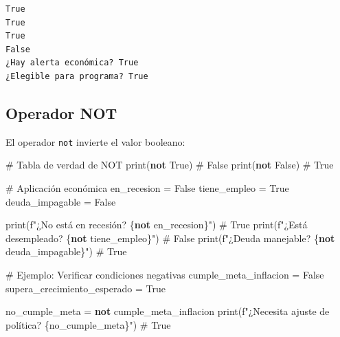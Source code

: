 \documentclass[
  doc,
  floatsintext,
  longtable,
  a4paper,
  nolmodern,
  notxfonts,
  notimes,
  12pt,
  colorlinks=true,linkcolor=blue,citecolor=blue,urlcolor=blue]{apa7}
\newenvironment{Shaded}{\begin{snugshade}}{\end{snugshade}}
\newcommand{\BuiltInTok}[1]{\textcolor[rgb]{0.00,0.23,0.31}{#1}}
\newcommand{\CommentTok}[1]{\textcolor[rgb]{0.37,0.37,0.37}{#1}}
\newcommand{\KeywordTok}[1]{\textcolor[rgb]{0.00,0.23,0.31}{\textbf{#1}}}
\newcommand{\NormalTok}[1]{\textcolor[rgb]{0.00,0.23,0.31}{#1}}
\newcommand{\OperatorTok}[1]{\textcolor[rgb]{0.37,0.37,0.37}{#1}}
\newcommand{\SpecialCharTok}[1]{\textcolor[rgb]{0.37,0.37,0.37}{#1}}
\newcommand{\SpecialStringTok}[1]{\textcolor[rgb]{0.13,0.47,0.30}{#1}}
\newcommand{\VariableTok}[1]{\textcolor[rgb]{0.07,0.07,0.07}{#1}}
\begin{document}
\begin{verbatim}
True
True
True
False
¿Hay alerta económica? True
¿Elegible para programa? True
\end{verbatim}

\subsection{Operador NOT}\label{operador-not}

El operador \texttt{not} invierte el valor booleano:

\begin{Shaded}
\begin{Highlighting}[]
\CommentTok{\# Tabla de verdad de NOT}
\BuiltInTok{print}\NormalTok{(}\KeywordTok{not} \VariableTok{True}\NormalTok{)   }\CommentTok{\# False}
\BuiltInTok{print}\NormalTok{(}\KeywordTok{not} \VariableTok{False}\NormalTok{)  }\CommentTok{\# True}

\CommentTok{\# Aplicación económica}
\NormalTok{en\_recesion }\OperatorTok{=} \VariableTok{False}
\NormalTok{tiene\_empleo }\OperatorTok{=} \VariableTok{True}
\NormalTok{deuda\_impagable }\OperatorTok{=} \VariableTok{False}

\BuiltInTok{print}\NormalTok{(}\SpecialStringTok{f"¿No está en recesión? }\SpecialCharTok{\{}\KeywordTok{not}\NormalTok{ en\_recesion}\SpecialCharTok{\}}\SpecialStringTok{"}\NormalTok{)  }\CommentTok{\# True}
\BuiltInTok{print}\NormalTok{(}\SpecialStringTok{f"¿Está desempleado? }\SpecialCharTok{\{}\KeywordTok{not}\NormalTok{ tiene\_empleo}\SpecialCharTok{\}}\SpecialStringTok{"}\NormalTok{)    }\CommentTok{\# False}
\BuiltInTok{print}\NormalTok{(}\SpecialStringTok{f"¿Deuda manejable? }\SpecialCharTok{\{}\KeywordTok{not}\NormalTok{ deuda\_impagable}\SpecialCharTok{\}}\SpecialStringTok{"}\NormalTok{)  }\CommentTok{\# True}

\CommentTok{\# Ejemplo: Verificar condiciones negativas}
\NormalTok{cumple\_meta\_inflacion }\OperatorTok{=} \VariableTok{False}
\NormalTok{supera\_crecimiento\_esperado }\OperatorTok{=} \VariableTok{True}

\NormalTok{no\_cumple\_meta }\OperatorTok{=} \KeywordTok{not}\NormalTok{ cumple\_meta\_inflacion}
\BuiltInTok{print}\NormalTok{(}\SpecialStringTok{f"¿Necesita ajuste de política? }\SpecialCharTok{\{}\NormalTok{no\_cumple\_meta}\SpecialCharTok{\}}\SpecialStringTok{"}\NormalTok{)  }\CommentTok{\# True}
\end{Highlighting}
\end{Shaded}
\end{document}
